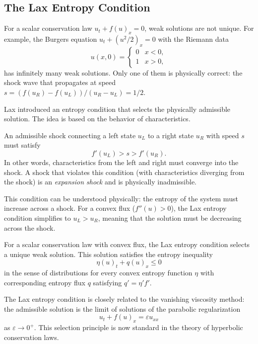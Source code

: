 \subsection{The Lax Entropy Condition}

For a scalar conservation law \(u_t + f(u)_x = 0\), weak solutions are not unique. For example, the Burgers equation \(u_t + (u^2/2)_x = 0\) with the Riemann data
\[
u(x,0) = \begin{cases}
0 & x < 0,\\
1 & x > 0,
\end{cases}
\]
has infinitely many weak solutions. Only one of them is physically correct: the shock wave that propagates at speed \(s = (f(u_R) - f(u_L))/(u_R - u_L) = 1/2\).

Lax introduced an entropy condition that selects the physically admissible solution. The idea is based on the behavior of characteristics.

\begin{condition}
An admissible shock connecting a left state \(u_L\) to a right state \(u_R\) with speed \(s\) must satisfy
\[
f'(u_L) > s > f'(u_R).
\]
In other words, characteristics from the left and right must converge into the shock. A shock that violates this condition (with characteristics diverging from the shock) is an \textit{expansion shock} and is physically inadmissible.
\end{condition}

This condition can be understood physically: the entropy of the system must increase across a shock. For a convex flux (\(f''(u) > 0\)), the Lax entropy condition simplifies to \(u_L > u_R\), meaning that the solution must be decreasing across the shock.

\begin{theorem}[Lax, 1971]
For a scalar conservation law with convex flux, the Lax entropy condition selects a unique weak solution. This solution satisfies the entropy inequality
\[
\eta(u)_t + q(u)_x \leq 0
\]
in the sense of distributions for every convex entropy function \(\eta\) with corresponding entropy flux \(q\) satisfying \(q' = \eta' f'\).
\end{theorem}

The Lax entropy condition is closely related to the vanishing viscosity method: the admissible solution is the limit of solutions of the parabolic regularization
\[
u_t + f(u)_x = \varepsilon u_{xx}
\]
as \(\varepsilon \to 0^+\). This selection principle is now standard in the theory of hyperbolic conservation laws.

